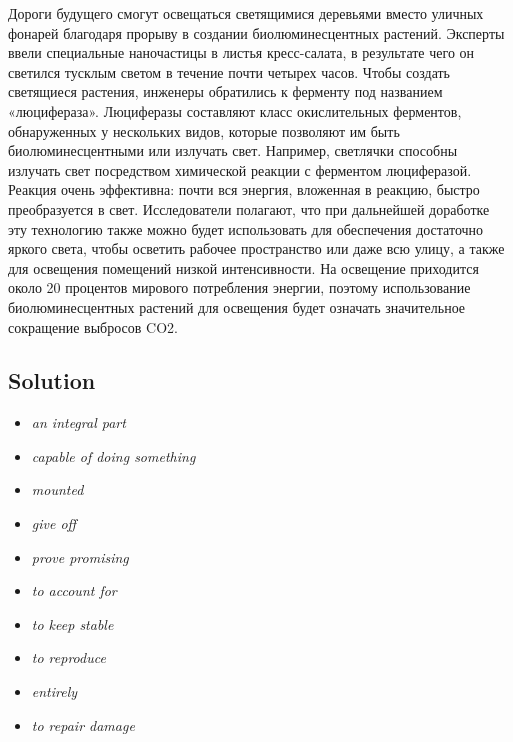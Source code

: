  Дороги будущего смогут освещаться светящимися деревьями вместо уличных фонарей благодаря прорыву в создании биолюминесцентных растений. Эксперты ввели специальные наночастицы в листья кресс-салата, в результате чего он светился тусклым светом в течение почти четырех часов. Чтобы создать светящиеся растения, инженеры обратились к ферменту под названием «люцифераза». Люциферазы составляют класс окислительных ферментов, обнаруженных у нескольких видов, которые позволяют им быть биолюминесцентными или излучать свет. Например, светлячки способны излучать свет посредством химической реакции с ферментом люциферазой. Реакция очень эффективна: почти вся энергия, вложенная в реакцию, быстро преобразуется в свет. Исследователи полагают, что при дальнейшей доработке эту технологию также можно будет использовать для обеспечения достаточно яркого света, чтобы осветить рабочее пространство или даже всю улицу, а также для освещения помещений низкой интенсивности. На освещение приходится около 20 процентов мирового потребления энергии, поэтому использование биолюминесцентных растений для освещения будет означать значительное сокращение выбросов CO2.

\subsection*{Solution}
\begin{itemize}
      \item \textit{an integral part}
\end{itemize}

\begin{itemize}
      \item \textit{capable of doing something}
      \item \textit{mounted}
      \item \textit{give off}
      \item \textit{prove promising}
\end{itemize}

\begin{itemize}
      \item \textit{to account for}
      \item \textit{to keep stable}
\end{itemize}

\begin{itemize}
      \item \textit{to reproduce}
      \item \textit{entirely}
      \item \textit{to repair damage}
\end{itemize}

